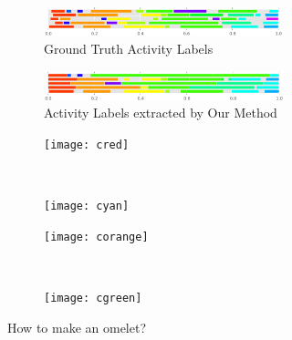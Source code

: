 \begin{figure}
  \begin{subfigure}[b]{0.5\textwidth}
    \begin{subfigure}[b]{\textwidth}
      \includegraphics[width=\textwidth]{act_gt_2}
      \caption*{Ground Truth Activity Labels}
    \end{subfigure}
    \begin{subfigure}[b]{\textwidth}
      \includegraphics[width=\textwidth]{act_our_2}
      \caption*{Activity Labels extracted by Our Method}
    \end{subfigure}
    \begin{subfigure}[b]{0.5\textwidth}
      \texttt{[image: cred]}
      \color[HTML]{FF3800}{Crack the eggs one at a time into a bowl.}
    \end{subfigure}~
    \begin{subfigure}[b]{0.5\textwidth}
      \texttt{[image: cyan]}
      \color[HTML]{00FFED}{Remove the omelet onto a plate.}
    \end{subfigure}
    \begin{subfigure}[b]{0.5\textwidth}
      \texttt{[image: corange]}
      \color[HTML]{FF9900}{You can either use a fork or wire whisk to beat the eggs into a bowl.}
    \end{subfigure}~
    \begin{subfigure}[b]{0.5\textwidth}
      \texttt{[image: cgreen]}
      \color[HTML]{9DFF00}{Eggs cook quickly, so make sure the pan gets very hot first; the butter melt completely.}
    \end{subfigure}
    \caption{How to make an omelet?}
    \label{recipe:ommelette}
  \end{subfigure}\quad\quad\begin{subfigure}[b]{0.47\textwidth}
  

\end{subfigure}
\end{figure}
